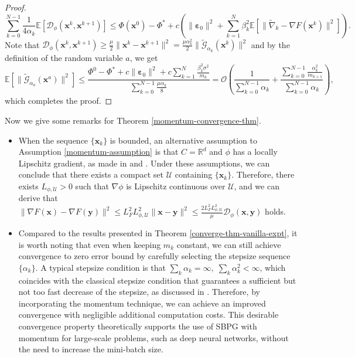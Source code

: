 \documentclass[twoside,11pt]{article}
\newcommand{\R}{\mathbb R}
\newcommand{\E}{\mathbb{E}}
\newcommand{\cD}{\mathcal D}
\newcommand{\cU}{\mathcal U}
\def\vx{{\bm{x}}}
\def\vy{{\bm{y}}}
\begin{document}
\begin{proof}
\[
\sum_{k=0}^{N-1}\frac{1}{4\alpha_k}\E[{\cD_\phi}({\vx^k},{\vx^{k+1}})]\leq\Phi(\vx^0)-\Phi^*+c\left(\|{\bm\varepsilon}_0\|^2+\sum_{k=1}^N\beta_k^2\E[\|\widetilde\nabla_k-\nabla F({\vx^k})\|^2]\right). 
\]
Note that ${\cD_\phi}({\vx^k},{\vx^{k+1}})\geq\frac{\mu}{2}\|{\vx^k}-{\vx^{k+1}}\|^2=\frac{\mu\alpha_k^2}{2}\|\widetilde{\mathcal{G}}_{\alpha_k}({\vx^k})\|^2$ and by the definition of the random variable $a$, we get
\[
\E[\|\widetilde{\mathcal G}_{\alpha_a}(\vx^{a})\|^2]\leq\frac{\Phi^0-\Phi^*+ {c\|\bm{\varepsilon}_0\|^2}
+c\sum_{k=1}^N\frac{\beta_k^2\sigma^2}{m_k}}{\sum_{k=0}^{N-1}\frac{\mu\alpha_k}{8}}=\mathcal{O}\left(\frac{1}{\sum_{k=0}^{N-1}\alpha_k}+\frac{\sum_{k=0}^{N-1}\frac{\alpha_k^2}{m_{k+1}}}{\sum_{k=0}^{N-1}\alpha_k}\right),
\]     
which completes the proof.
\end{proof}

\begin{remark}
Now we give some remarks for Theorem \ref{momentum-convergence-thm}.
\begin{itemize}
\item[1.] When the sequence $\{\vx_k\}$ is bounded, an alternative assumption to Assumption \ref{momentum-assumption} is that $C=\R^d$ and $\phi$ has a locally Lipschitz gradient, as made in \cite[Theorem 4.1]{bolte2018first} and \cite[Theorem 4.7]{latafat2022bregman}. Under these assumptions, we can conclude that there exists a compact set $\cU$ containing $\{\vx_k\}$. Therefore, there exists $L_{\phi,\cU}>0$ such that $\nabla\phi$ is Lipschitz continuous over $\cU$, and we can derive that $\|\nabla F(\vx)-\nabla F(\vy)\|^2\leq L_F^2L_{\phi,\cU}^2\|\vx-\vy\|^2\leq\frac{2L_F^2L_{\phi,\cU}^2}{\mu}\cD_\phi(\vx,\vy)$ holds. %
\item[2.] Compared to the results presented in Theorem \ref{converge-thm-vanilla-expt}, it is worth noting that even when keeping $m_k$ constant, we can still achieve convergence to zero error bound by carefully selecting the stepsize sequence $\{\alpha_k\}$. A typical stepsize condition is that $\sum_{k}\alpha_k=\infty,\;\sum_{k}\alpha_k^2<\infty$, which coincides with the classical stepsize condition that guarantees a sufficient but not too fast decrease of the stepsize, as discussed in \cite{bertsekas2000gradient}.  Therefore, by incorporating the momentum technique, we can achieve an improved convergence with negligible additional computation costs. This desirable convergence property theoretically supports the use of SBPG with momentum for large-scale problems, such as deep neural networks, without the need to increase the mini-batch size. 
\end{itemize}
\end{remark}
\end{document}
